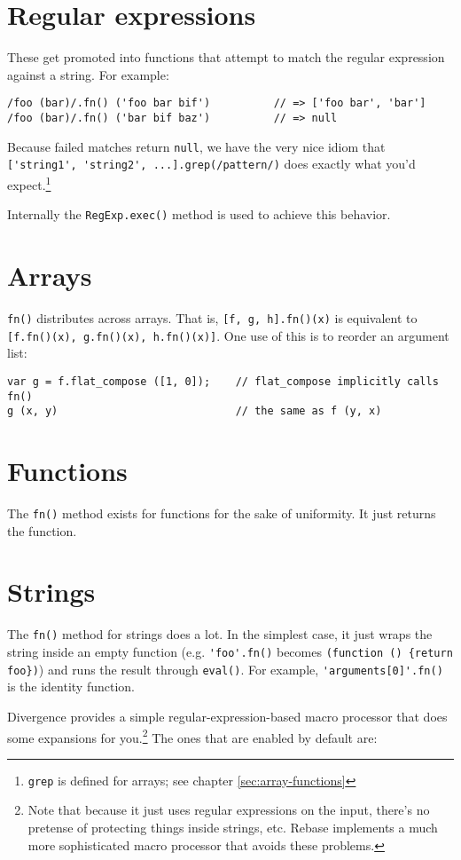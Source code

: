 \documentclass{report}
\begin{document}
\section {Regular expressions}
      These get promoted into functions that attempt to match the regular expression against a string. For example:

\begin{verbatim}
/foo (bar)/.fn() ('foo bar bif')          // => ['foo bar', 'bar']
/foo (bar)/.fn() ('bar bif baz')          // => null
\end{verbatim}

      Because failed matches return \verb|null|, we have the very nice idiom that \verb|['string1', 'string2', ...].grep(/pattern/)| does exactly what you'd expect.\footnote{{\tt grep} is
      defined for arrays; see chapter \ref{sec:array-functions}}

      Internally the \verb|RegExp.exec()| method is used to achieve this behavior.

\section {Arrays}
      \verb|fn()| distributes across arrays. That is, \verb|[f, g, h].fn()(x)| is equivalent to \verb|[f.fn()(x), g.fn()(x), h.fn()(x)]|. One use of this is to reorder an argument list:

\begin{verbatim}
var g = f.flat_compose ([1, 0]);    // flat_compose implicitly calls fn()
g (x, y)                            // the same as f (y, x)
\end{verbatim}

\section {Functions}
      The \verb|fn()| method exists for functions for the sake of uniformity. It just returns the function.

\section {Strings}
      The \verb|fn()| method for strings does a lot. In the simplest case, it just wraps the string inside an empty function (e.g. \verb|'foo'.fn()| becomes \verb|(function () {return foo})|)
      and runs the result through \verb|eval()|. For example, \verb|'arguments[0]'.fn()| is the identity function.

      Divergence provides a simple regular-expression-based macro processor that does some expansions for you.\footnote{Note that because it just uses regular expressions on the input, there's
      no pretense of protecting things inside strings, etc. Rebase implements a much more sophisticated macro processor that avoids these problems.} The ones that are enabled by default are:
\end{document}

